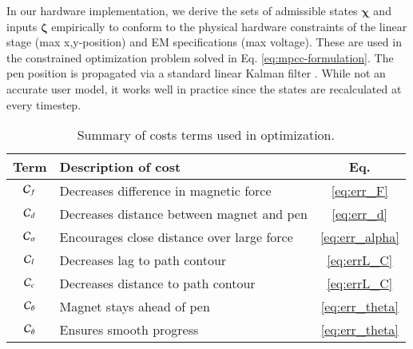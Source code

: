 In our hardware implementation, we derive the sets of admissible states $\boldsymbol{\chi}$ and inputs $\boldsymbol{\zeta}$ empirically to conform to the physical hardware constraints of the linear stage (\eg max x,y-position) and EM specifications (\eg max voltage). 
These are used in the constrained optimization problem solved in Eq. \ref{eq:mpcc-formulation}.
%
The pen position is propagated via a standard linear Kalman filter \cite{gibbs2011advanced}. 
While not an accurate user model, it works well in practice since the states are recalculated at every timestep. 



\begin{table}[!t]
	\begin{tabular}{clc}
    \toprule
    Term & Description of cost & Eq.\\
    \midrule
     $\mathcal{C}_f$  		& Decreases difference in magnetic force		& \ref{eq:err_F}
     \\
    $\mathcal{C}_d$ 		& Decreases distance between magnet and pen		& \ref{eq:err_d}
    \\
    $\mathcal{C}_{\alpha}$ 		& Encourages close distance over large force		& \ref{eq:err_alpha}
    \\
     $\mathcal{C}_l$   				& Decreases lag to path contour		& \ref{eq:errL_C} 
     \\     
     $\mathcal{C}_c$  			& Decreases distance to path contour		& \ref{eq:errL_C} 
     \\
     $\mathcal{C}_{\theta}$  				& Magnet stays ahead of pen		& \ref{eq:err_theta}
     \\
     $\mathcal{C}_{\dot{\theta}}$ 		& Ensures smooth progress		& \ref{eq:err_theta}
    \\
     \bottomrule
\end{tabular}
\caption{Summary of costs terms used in optimization.}
\label{tab:costs}
\end{table}


